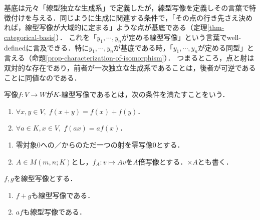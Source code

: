 \documentclass[uplatex, dvipdfmx]{jsreport}
\begin{document}
\begin{tcolorbox}[colframe=ForestGreen, colback=ForestGreen!10!white, breakable]
    基底は元々「線型独立な生成系」で定義したが，線型写像を定義しその言葉で特徴付けを与える．同じように生成に関連する条件で，「その点の行き先さえ決めれば，線型写像が大域的に定まる」ような点が基底である（定理\ref{thm-categorical-basis}）．
    これを「$y_1,\cdots,y_n$が定める線型写像」という言葉でwell-definedに言及できる．特に$y_1,\cdots,y_n$が基底である時，「$y_1,\cdots,y_n$が定める同型」と言える（命題\ref{prop-characterization-of-isomorphism}）．
    つまるところ，点と射は双対的な存在であり，前者が一次独立な生成系であることは，後者が可逆であることに同値なのである．
\end{tcolorbox}

\begin{definition}
    写像$f:V\to W$が$K$-線型写像であるとは，次の条件を満たすことをいう．
    \begin{enumerate}
        \item $\forall x,y\in V,\; f(x+y)=f(x)+f(y)$．
        \item $\forall a\in K,x\in V,\; f(ax)=af(x)$．
    \end{enumerate}
\end{definition}
\begin{example}[特別な線型写像]\mbox{}
    \begin{enumerate}
        \item 零対象$0$への／からのただ一つの射を零写像$0$とする．
        \item $A\in M(m,n;K)$とし，$f_A:v\mapsto Av$を$A$倍写像とする．$\times A$とも書く．
    \end{enumerate}
\end{example}

\begin{proposition}
    $f,g$を線型写像とする．
    \begin{enumerate}
        \item $f+g$も線型写像である．
        \item $af$も線型写像である．
    \end{enumerate}
\end{proposition}
\end{document}
